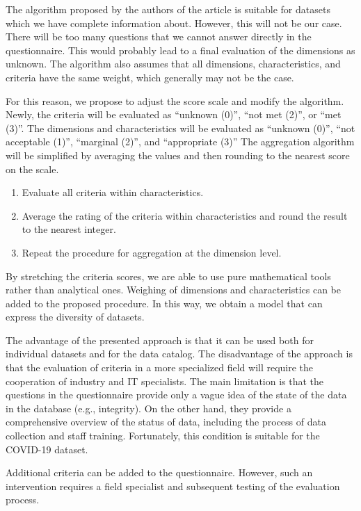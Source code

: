 The algorithm proposed by the authors of the article is suitable for datasets which we have complete information about.
However, this will not be our case.
There will be too many questions that we cannot answer directly in the questionnaire.
This would probably lead to a final evaluation of the dimensions as unknown.
The algorithm also assumes that all dimensions, characteristics, and criteria have the same weight, which generally may not be the case.

For this reason, we propose to adjust the score scale and modify the algorithm.
Newly, the criteria will be evaluated as \enquote{unknown (0)}, \enquote{not met (2)}, or \enquote{met (3)}.
The dimensions and characteristics will be evaluated as \enquote{unknown (0)}, \enquote{not acceptable (1)}, \enquote{marginal (2)}, and \enquote{appropriate (3)}
The aggregation algorithm will be simplified by averaging the values and then rounding to the nearest score on the scale.
\begin{enumerate}
    \item Evaluate all criteria within characteristics.
    \item Average the rating of the criteria within characteristics and round the result to the nearest integer.
    \item Repeat the procedure for aggregation at the dimension level.
\end{enumerate}

By stretching the criteria scores, we are able to use pure mathematical tools rather than analytical ones.
Weighing of dimensions and characteristics can be added to the proposed procedure.
In this way, we obtain a model that can express the diversity of datasets.

The advantage of the presented approach is that it can be used both for individual datasets and for the data catalog.
The disadvantage of the approach is that the evaluation of criteria in a more specialized field will require the cooperation of industry and IT specialists.
The main limitation is that the questions in the questionnaire provide only a vague idea of the state of the data in the database (e.g., integrity).
On the other hand, they provide a comprehensive overview of the status of data, including the process of data collection and staff training.
Fortunately, this condition is suitable for the COVID-19 dataset.

Additional criteria can be added to the questionnaire.
However, such an intervention requires a field specialist and subsequent testing of the evaluation process.

